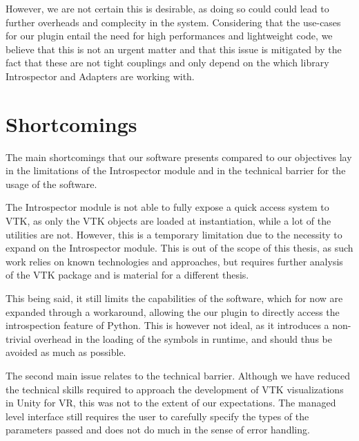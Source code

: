However, we are not certain this is desirable, as doing so could could lead to further overheads and complecity in the system. Considering that the use-cases for our plugin entail the need for high performances and lightweight code, we believe that this is not an urgent matter and that this issue is mitigated by the fact that these are not tight couplings and only depend on the which library Introspector and Adapters are working with.

\section{Shortcomings}




The main shortcomings that our software presents compared to our objectives lay in the limitations of the Introspector module and in the technical barrier for the usage of the software.

The Introspector module is not able to fully expose a quick access system to VTK, as only the VTK objects are loaded at instantiation, while a lot of the utilities are not. However, this is a temporary limitation due to the necessity to expand on the Introspector module. This is out of the scope of this thesis, as such work relies on known technologies and approaches, but requires further analysis of the VTK package and is material for a different thesis.

This being said, it still limits the capabilities of the software, which for now are expanded through a workaround, allowing the our plugin to directly access the introspection feature of Python. This is however not ideal, as it introduces a non-trivial overhead in the loading of the symbols in runtime, and should thus be avoided as much as possible.

The second main issue relates to the technical barrier. Although we have reduced the technical skills required to approach the development of VTK visualizations in Unity for VR, this was not to the extent of our expectations. The managed level interface still requires the user to carefully specify the types of the parameters passed and does not do much in the sense of error handling.

